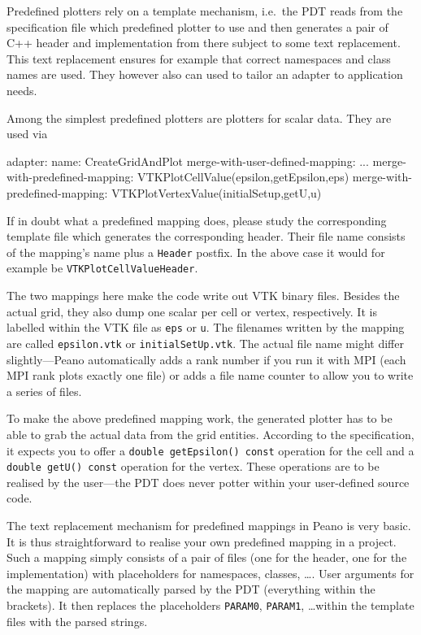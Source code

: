Predefined plotters rely on a template mechanism, i.e.~the PDT reads from the
specification file which predefined plotter to use and then generates a pair of
C++ header and implementation from there subject to some text replacement.
This text replacement ensures for example that correct namespaces and class
names are used.
They however also can used to tailor an adapter to application needs.

Among the simplest predefined plotters are plotters for scalar data.
They are used via 
\begin{code}
adapter:
  name: CreateGridAndPlot
  merge-with-user-defined-mapping: ...
  merge-with-predefined-mapping: VTKPlotCellValue(epsilon,getEpsilon,eps)
  merge-with-predefined-mapping: VTKPlotVertexValue(initialSetup,getU,u)
\end{code}

\noindent
If in doubt what a predefined mapping does, please study the corresponding
template file which generates the corresponding header. 
Their file name consists of the mapping's name plus a \texttt{Header} postfix.
In the above case it would for example be \texttt{VTKPlotCellValueHeader}.


The two mappings here make the code write out VTK binary files.
Besides the actual grid, they also dump one scalar per cell or vertex,
respectively.
It is labelled within the VTK file as \texttt{eps} or \texttt{u}.
The filenames written by the mapping are called \texttt{epsilon.vtk} or
\texttt{initialSetUp.vtk}.
The actual file name might differ slightly---Peano automatically adds a rank
number if you run it with MPI (each MPI rank plots exactly one file) or adds a
file name counter to allow you to write a series of files.

To make the above predefined mapping work, the generated plotter has to be
able to grab the actual data from the grid entities.
According to the specification, it expects you to offer a \texttt{double
getEpsilon() const} operation for the cell and a \texttt{double getU() const}
operation for the vertex.
These operations are to be realised by the user---the PDT does never potter
within your user-defined source code.

\begin{remark}
 The text replacement mechanism for predefined mappings in Peano is very basic.
 It is thus straightforward to realise your own predefined mapping in a project.
 Such a mapping simply consists of a pair of files (one for the header, one for
 the implementation) with placeholders for namespaces, classes, \ldots. User
 arguments for the mapping are automatically parsed by the PDT
 (everything within the brackets). It then replaces the placeholders
 \texttt{PARAM0}, \texttt{PARAM1}, \ldots within the template files with the
 parsed strings.
\end{remark}


